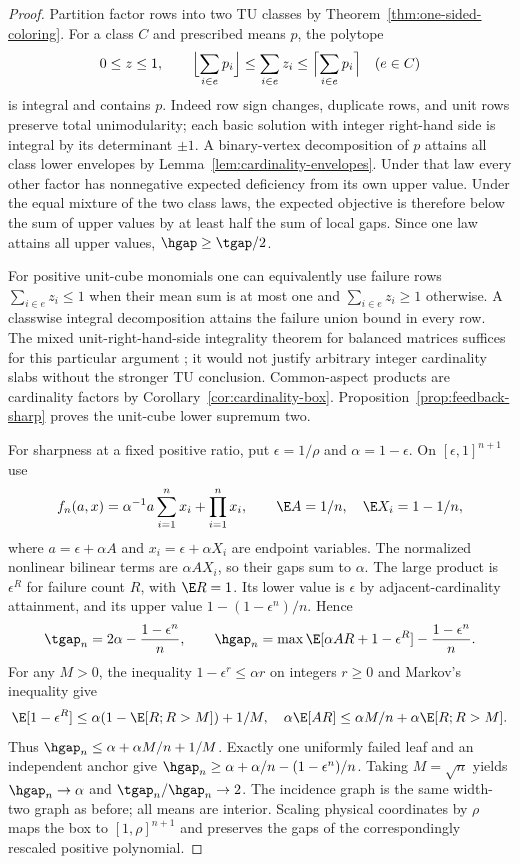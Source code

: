 \begin{proof}
Partition factor rows into two TU classes by
Theorem~\ref{thm:one-sided-coloring}. For a class $C$ and prescribed
means $p$, the polytope
\[
 0\le z\le1,\qquad
 \Bigl\lfloor\sum_{i\in e}p_i\Bigr\rfloor
 \le\sum_{i\in e}z_i\le
 \Bigl\lceil\sum_{i\in e}p_i\Bigr\rceil\quad(e\in C)
\]
is integral and contains $p$. Indeed row sign changes, duplicate rows,
and unit rows preserve total unimodularity; each basic solution with
integer right-hand side is integral by its determinant $\pm1$.
A binary-vertex decomposition of $p$ attains all class lower envelopes
by Lemma~\ref{lem:cardinality-envelopes}. Under that law every other
factor has nonnegative expected deficiency from its own upper value.
Under the equal mixture of the two class laws, the expected objective
is therefore below the sum of upper values by at least half the sum of
local gaps. Since one law attains all upper values, $\hgap\ge\tgap/2$.

For positive unit-cube monomials one can equivalently use failure rows
$\sum_{i\in e}z_i\le1$ when their mean sum is at most one and
$\sum_{i\in e}z_i\ge1$ otherwise. A classwise integral decomposition
attains the failure union bound in every row. The mixed unit-right-hand-side
integrality theorem for balanced matrices suffices for this particular
argument \citep[Theorem 6.13]{Cornuejols2000}; it would not justify
arbitrary integer cardinality slabs without the stronger TU conclusion.
Common-aspect products are cardinality factors by
Corollary~\ref{cor:cardinality-box}. Proposition~\ref{prop:feedback-sharp}
proves the unit-cube lower supremum two.

For sharpness at a fixed positive ratio, put $\epsilon=1/\rho$ and
$\alpha=1-\epsilon$. On $[\epsilon,1]^{n+1}$ use
\[
 f_n(a,x)=\alpha^{-1}a\sum_{i=1}^nx_i+\prod_{i=1}^nx_i,
 \qquad \E A=1/n,\quad\E X_i=1-1/n,
\]
where $a=\epsilon+\alpha A$ and $x_i=\epsilon+\alpha X_i$ are endpoint
variables. The normalized nonlinear bilinear terms are $\alpha AX_i$,
so their gaps sum to $\alpha$. The large product is $\epsilon^R$ for
failure count $R$, with $\E R=1$. Its lower value is $\epsilon$ by
adjacent-cardinality attainment, and its upper value
$1-(1-\epsilon^n)/n$. Hence
\[
 \tgap_n=2\alpha-\frac{1-\epsilon^n}{n},\qquad
 \hgap_n=\max\E[\alpha AR+1-\epsilon^R]-\frac{1-\epsilon^n}{n}.
\]
For any $M>0$, the inequality $1-\epsilon^r\le\alpha r$ on integers
$r\ge0$ and Markov's inequality give
\[
 \E[1-\epsilon^R]\le\alpha(1-\E[R;R>M])+1/M,
 \quad \alpha\E[AR]\le\alpha M/n+\alpha\E[R;R>M].
\]
Thus
$\hgap_n\le\alpha+\alpha M/n+1/M$. Exactly one uniformly failed leaf
and an independent anchor give
$\hgap_n\ge\alpha+\alpha/n-(1-\epsilon^n)/n$.
Taking $M=\sqrt n$ yields $\hgap_n\to\alpha$ and
$\tgap_n/\hgap_n\to2$. The incidence graph is the same width-two graph
as before; all means are interior. Scaling physical coordinates by
$\rho$ maps the box to $[1,\rho]^{n+1}$ and preserves the gaps of the
correspondingly rescaled positive polynomial.
\end{proof}

